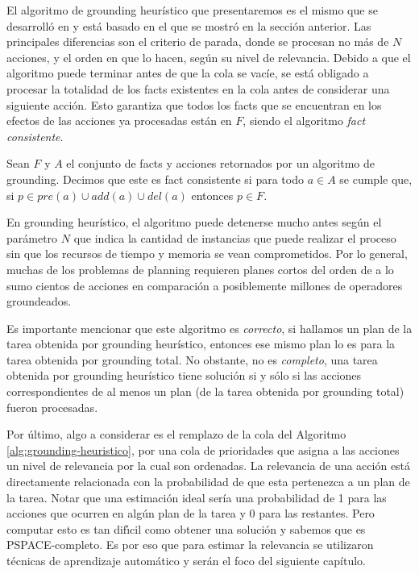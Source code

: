 El algoritmo de grounding heurístico que presentaremos es el mismo que se
desarrolló en \citep{Gnad_Torralba_Dominguez_Areces_Bustos_2019} y está basado
en el que se mostró en la sección anterior. Las principales diferencias son el
criterio de parada, donde se procesan no más de $N$ acciones, y el orden en que
lo hacen, según su nivel de relevancia. Debido a que el algoritmo puede terminar
antes de que la cola se vacíe, se está obligado a procesar la totalidad de los
facts existentes en la cola antes de considerar una siguiente acción. Esto
garantiza que todos los facts que se encuentran en los efectos de las acciones
ya procesadas están en $F$, siendo el algoritmo \emph{fact consistente}.

\begin{mydef}
    Sean $F$ y $A$ el conjunto de facts y acciones retornados por un algoritmo
    de grounding. Decimos que este es fact consistente si para todo $a \in A$ se
    cumple que, si $p \in pre(a) \cup add(a) \cup del(a)$ entonces $p \in F$.
\end{mydef}

En grounding heurístico, el algoritmo puede detenerse mucho antes según el
parámetro $N$ que indica la cantidad de instancias que puede realizar el proceso
sin que los recursos de tiempo y memoria se vean comprometidos. Por lo general,
muchas de los problemas de planning requieren planes cortos del orden de a lo
sumo cientos de acciones en comparación a posiblemente millones de operadores
groundeados.

Es importante mencionar que este algoritmo es \emph{correcto}, si hallamos un
plan de la tarea obtenida por grounding heurístico, entonces ese mismo plan lo
es para la tarea obtenida por grounding total. No obstante, no es
\emph{completo}, una tarea obtenida por grounding heurístico tiene solución si y
sólo si las acciones correspondientes de al menos un plan (de la tarea obtenida
por grounding total) fueron procesadas.

Por último, algo a considerar es el remplazo de la cola del Algoritmo
\ref{alg:grounding-heuristico}, por una cola de prioridades que asigna a las
acciones un nivel de relevancia por la cual son ordenadas. La relevancia de una
acción está directamente relacionada con la probabilidad de que esta pertenezca
a un plan de la tarea. Notar que una estimación ideal sería una probabilidad de
1 para las acciones que ocurren en algún plan de la tarea y 0 para las
restantes. Pero computar esto es tan difı́cil como obtener una solución y
sabemos que es PSPACE-completo. Es por eso que para estimar la relevancia se
utilizaron técnicas de aprendizaje automático y serán el foco del siguiente
capítulo.
